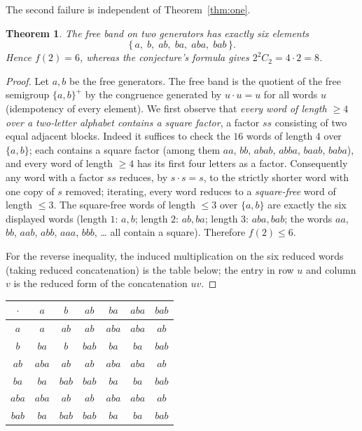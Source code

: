 \documentclass[11pt]{article}
\newtheorem{theorem}{Theorem}
\theoremstyle{definition}
\theoremstyle{remark}
\begin{document}
The second failure is independent of Theorem~\ref{thm:one}.

\begin{theorem}\label{thm:two}
The free band on two generators has exactly six elements
\[
\{\,a,\; b,\; ab,\; ba,\; aba,\; bab\,\}.
\]
Hence $f(2) = 6$, whereas the conjecture's formula gives $2^2 C_2 = 4 \cdot 2 =
8$.
\end{theorem}

\begin{proof}
Let $a, b$ be the free generators. The free band is the quotient of the free
semigroup $\{a,b\}^+$ by the congruence generated by $u \cdot u = u$ for all
words $u$ (idempotency of every element). We first observe that \emph{every
word of length $\ge 4$ over a two-letter alphabet contains a square factor}, a
factor $ss$ consisting of two equal adjacent blocks. Indeed it suffices to check
the $16$ words of length $4$ over $\{a,b\}$; each contains a square factor
(among them $aa$, $bb$, $abab$, $abba$, $baab$, $baba$), and every word of
length $\ge 4$ has its first four letters as a factor. Consequently any word
with a factor $ss$ reduces, by $s \cdot s = s$, to the strictly shorter word
with one copy of $s$ removed; iterating, every word reduces to a
\emph{square-free} word
of length $\le 3$. The square-free words of length $\le 3$ over $\{a,b\}$ are
exactly the six displayed words (length $1$: $a, b$; length $2$: $ab, ba$;
length $3$: $aba, bab$; the words $aa$, $bb$, $aab$, $abb$, $aaa$, $bbb$, \dots{}
all contain a square). Therefore $f(2) \le 6$.

For the reverse inequality, the induced multiplication on the six reduced words
(taking reduced concatenation) is the table below; the entry in row $u$ and
column $v$ is the reduced form of the concatenation $uv$.
\end{proof}

\begin{center}
\begin{tabular}{c|cccccc}
\toprule
$\cdot$ & $a$ & $b$ & $ab$ & $ba$ & $aba$ & $bab$ \\
\midrule
$a$   & $a$   & $ab$  & $ab$  & $aba$ & $aba$ & $ab$  \\
$b$   & $ba$  & $b$   & $bab$ & $ba$  & $ba$  & $bab$ \\
$ab$  & $aba$ & $ab$  & $ab$  & $aba$ & $aba$ & $ab$  \\
$ba$  & $ba$  & $bab$ & $bab$ & $ba$  & $ba$  & $bab$ \\
$aba$ & $aba$ & $ab$  & $ab$  & $aba$ & $aba$ & $ab$  \\
$bab$ & $ba$  & $bab$ & $bab$ & $ba$  & $ba$  & $bab$ \\
\bottomrule
\end{tabular}
\end{center}
\end{document}

